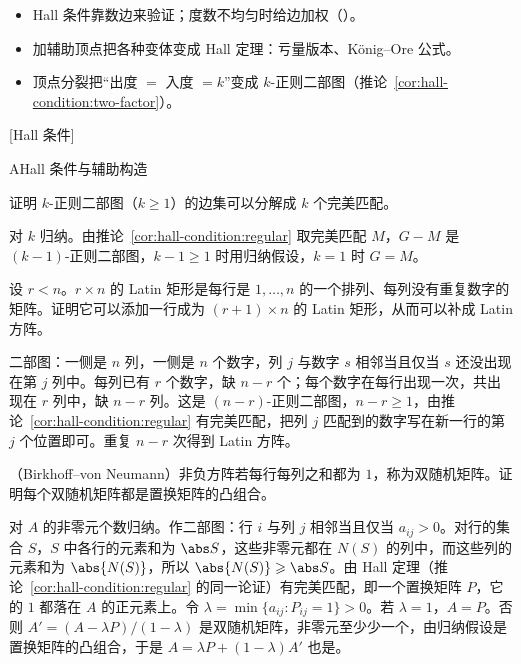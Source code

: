 \begin{itemize}
\item Hall 条件靠数边来验证；度数不均匀时给边加权（）。
\item 加辅助顶点把各种变体变成 Hall 定理：亏量版本、König--Ore 公式。
\item 顶点分裂把“出度 $=$ 入度 $=k$”变成 $k$-正则二部图（推论~\ref{cor:hall-condition:two-factor}）。
\end{itemize}

[Hall 条件]


\begin{exercises}{A}{Hall 条件与辅助构造}
\item\label{ex:hall-condition:A1} 证明 $k$-正则二部图（$k\geqslant1$）的边集可以分解成 $k$ 个完美匹配。
\begin{solution}
对 $k$ 归纳。由推论~\ref{cor:hall-condition:regular} 取完美匹配 $M$，$G-M$ 是 $(k-1)$-正则二部图，$k-1\geqslant1$ 时用归纳假设，$k=1$ 时 $G=M$。
\end{solution}

\item\label{ex:hall-condition:A2} 设 $r<n$。$r\times n$ 的 Latin 矩形是每行是 $1,\dots,n$ 的一个排列、每列没有重复数字的矩阵。证明它可以添加一行成为 $(r+1)\times n$ 的 Latin 矩形，从而可以补成 Latin 方阵。
\begin{solution}
二部图：一侧是 $n$ 列，一侧是 $n$ 个数字，列 $j$ 与数字 $s$ 相邻当且仅当 $s$ 还没出现在第 $j$ 列中。每列已有 $r$ 个数字，缺 $n-r$ 个；每个数字在每行出现一次，共出现在 $r$ 列中，缺 $n-r$ 列。这是 $(n-r)$-正则二部图，$n-r\geqslant1$，由推论~\ref{cor:hall-condition:regular} 有完美匹配，把列 $j$ 匹配到的数字写在新一行的第 $j$ 个位置即可。重复 $n-r$ 次得到 Latin 方阵。
\end{solution}

\item\label{ex:hall-condition:A3} （Birkhoff--von Neumann）非负方阵若每行每列之和都为 $1$，称为双随机矩阵。证明每个双随机矩阵都是置换矩阵的凸组合。
\begin{solution}
对 $A$ 的非零元个数归纳。作二部图：行 $i$ 与列 $j$ 相邻当且仅当 $a_{ij}>0$。对行的集合 $S$，$S$ 中各行的元素和为 $\abs S$，这些非零元都在 $N(S)$ 的列中，而这些列的元素和为 $\abs{N(S)}$，所以 $\abs{N(S)}\geqslant\abs S$。由 Hall 定理（推论~\ref{cor:hall-condition:regular} 的同一论证）有完美匹配，即一个置换矩阵 $P$，它的 $1$ 都落在 $A$ 的正元素上。令 $\lambda=\min\{a_{ij}:P_{ij}=1\}>0$。若 $\lambda=1$，$A=P$。否则 $A'=(A-\lambda P)/(1-\lambda)$ 是双随机矩阵，非零元至少少一个，由归纳假设是置换矩阵的凸组合，于是 $A=\lambda P+(1-\lambda)A'$ 也是。
\end{solution}


\end{exercises}

